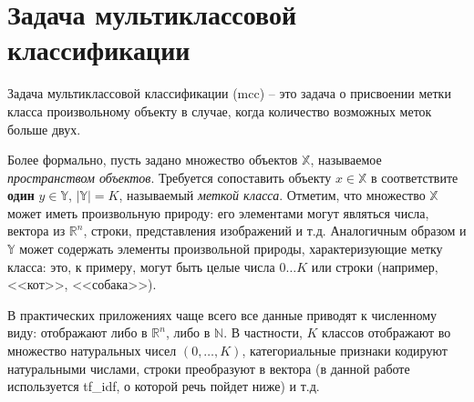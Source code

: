 
\chapter{Задача мультиклассовой классификации }
Задача мультиклассовой классификации (\acrlong{mcc}) -- это задача о присвоении метки класса произвольному объекту в случае, когда количество возможных меток больше двух.

Более формально, пусть задано множество объектов $\mathbb{X}$, называемое \textit{пространством объектов}.
Требуется сопоставить объекту $x \in \mathbb{X}$ в соответствите \textbf{один} $y \in \mathbb{Y}$, $|\mathbb{Y}| = K$, называемый \textit{меткой класса}.
Отметим, что множество $\mathbb{X}$ может иметь произвольную природу: его элементами могут являться числа, вектора из $\mathbb{R}^n$, строки, представления изображений и т.д.
Аналогичным образом и $\mathbb{Y}$ может содержать элементы произвольной природы, характеризующие метку класса: это, к примеру, могут быть целые числа $0 \dots K$ или строки (например, <<кот>>, <<собака>>).

В практических приложениях чаще всего все данные приводят к численному виду: отображают либо в $\mathbb{R}^n$, либо в $\mathbb{N}$.
В частности, $K$ классов отображают во множество натуральных чисел $(0, \dots, K)$, категориальные признаки кодируют натуральными числами, строки преобразуют в вектора (в данной работе используется \acrshort{tf_idf}, о которой речь пойдет ниже) и т.д.

